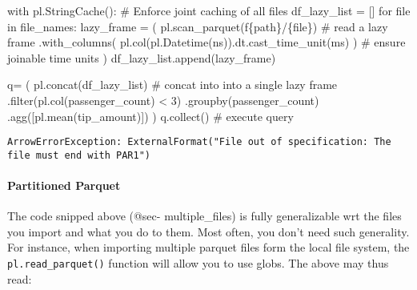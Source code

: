 \documentclass[
  letterpaper,
  DIV=11,
  numbers=noendperiod]{scrartcl}
\let\oldparagraph\paragraph
\renewcommand{\paragraph}[1]{\oldparagraph{#1}\mbox{}}
\newenvironment{Shaded}{\begin{snugshade}}{\end{snugshade}}
\newcommand{\BuiltInTok}[1]{\textcolor[rgb]{0.00,0.23,0.31}{#1}}
\newcommand{\CommentTok}[1]{\textcolor[rgb]{0.37,0.37,0.37}{#1}}
\newcommand{\ControlFlowTok}[1]{\textcolor[rgb]{0.00,0.23,0.31}{#1}}
\newcommand{\DecValTok}[1]{\textcolor[rgb]{0.68,0.00,0.00}{#1}}
\newcommand{\KeywordTok}[1]{\textcolor[rgb]{0.00,0.23,0.31}{#1}}
\newcommand{\NormalTok}[1]{\textcolor[rgb]{0.00,0.23,0.31}{#1}}
\newcommand{\OperatorTok}[1]{\textcolor[rgb]{0.37,0.37,0.37}{#1}}
\newcommand{\SpecialCharTok}[1]{\textcolor[rgb]{0.37,0.37,0.37}{#1}}
\newcommand{\SpecialStringTok}[1]{\textcolor[rgb]{0.13,0.47,0.30}{#1}}
\newcommand{\StringTok}[1]{\textcolor[rgb]{0.13,0.47,0.30}{#1}}
\begin{document}
\begin{Shaded}
\begin{Highlighting}[]
\ControlFlowTok{with}\NormalTok{ pl.StringCache(): }\CommentTok{\# Enforce joint caching of all files}
\NormalTok{  df\_lazy\_list }\OperatorTok{=}\NormalTok{ []}
  \ControlFlowTok{for} \BuiltInTok{file} \KeywordTok{in}\NormalTok{ file\_names:}
\NormalTok{    lazy\_frame }\OperatorTok{=}\NormalTok{ (}
\NormalTok{        pl.scan\_parquet(}\SpecialStringTok{f\textquotesingle{}}\SpecialCharTok{\{}\NormalTok{path}\SpecialCharTok{\}}\SpecialStringTok{/}\SpecialCharTok{\{}\BuiltInTok{file}\SpecialCharTok{\}}\SpecialStringTok{\textquotesingle{}}\NormalTok{) }\CommentTok{\# read a lazy frame}
\NormalTok{        .with\_columns(}
\NormalTok{            pl.col(pl.Datetime(}\StringTok{\textquotesingle{}ns\textquotesingle{}}\NormalTok{)).dt.cast\_time\_unit(}\StringTok{\textquotesingle{}ms\textquotesingle{}}\NormalTok{)}
\NormalTok{            ) }\CommentTok{\# ensure joinable time units}
\NormalTok{    )}
\NormalTok{    df\_lazy\_list.append(lazy\_frame)}

\NormalTok{q}\OperatorTok{=}\NormalTok{ (}
\NormalTok{    pl.concat(df\_lazy\_list) }\CommentTok{\# concat into into a single lazy frame}
\NormalTok{    .}\BuiltInTok{filter}\NormalTok{(pl.col(}\StringTok{\textquotesingle{}passenger\_count\textquotesingle{}}\NormalTok{) }\OperatorTok{\textless{}} \DecValTok{3}\NormalTok{)}
\NormalTok{    .groupby(}\StringTok{\textquotesingle{}passenger\_count\textquotesingle{}}\NormalTok{)}
\NormalTok{    .agg([pl.mean(}\StringTok{\textquotesingle{}tip\_amount\textquotesingle{}}\NormalTok{)])}
\NormalTok{)}
\NormalTok{q.collect() }\CommentTok{\# execute query}
\end{Highlighting}
\end{Shaded}

\begin{verbatim}
ArrowErrorException: ExternalFormat("File out of specification: The file must end with PAR1")
\end{verbatim}

\hypertarget{partitioned-parquet}{%
\paragraph{Partitioned Parquet}\label{partitioned-parquet}}

The code snipped above (@sec- multiple\_files) is fully generalizable
wrt the files you import and what you do to them. Most often, you don't
need such generality. For instance, when importing multiple parquet
files form the local file system, the \texttt{pl.read\_parquet()}
function will allow you to use globs. The above may thus read:
\end{document}
